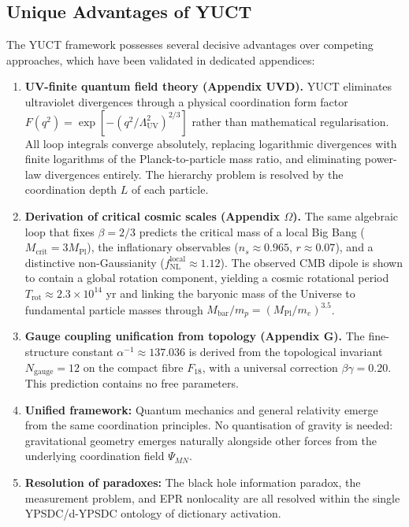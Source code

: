 \documentclass[12pt,a4paper]{article}
\theoremstyle{remark}
\begin{document}
\subsection{Unique Advantages of YUCT}

The YUCT framework possesses several decisive advantages over competing
approaches, which have been validated in dedicated appendices:

\begin{enumerate}
	\item \textbf{UV-finite quantum field theory (Appendix UVD).}
	YUCT eliminates ultraviolet divergences through a physical coordination
	form factor $F(q^2)=\exp[-(q^2/\Lambda_{\mathrm{UV}}^2)^{2/3}]$ rather than
	mathematical regularisation. All loop integrals converge absolutely,
	replacing logarithmic divergences with finite logarithms of the
	Planck-to-particle mass ratio, and eliminating power-law divergences
	entirely. The hierarchy problem is resolved by the coordination depth
	$L$ of each particle.
	
	\item \textbf{Derivation of critical cosmic scales (Appendix $\Omega$).}
	The same algebraic loop that fixes $\beta=2/3$ predicts the critical
	mass of a local Big Bang ($M_{\mathrm{crit}}=3M_{\mathrm{Pl}}$), the
	inflationary observables ($n_s\approx0.965$, $r\approx0.07$), and a
	distinctive non-Gaussianity ($f_{\mathrm{NL}}^{\mathrm{local}}\approx1.12$).
	The observed CMB dipole is shown to contain a global rotation component,
	yielding a cosmic rotational period $T_{\mathrm{rot}}\approx2.3\times10^{14}$ yr
	and linking the baryonic mass of the Universe to fundamental particle
	masses through $M_{\mathrm{bar}}/m_p=(M_{\mathrm{Pl}}/m_e)^{3.5}$.
	
	\item \textbf{Gauge coupling unification from topology (Appendix G).}
	The fine-structure constant $\alpha^{-1}\approx137.036$ is derived from the
	topological invariant $N_{\mathrm{gauge}}=12$ on the compact fibre $F_{18}$,
	with a universal correction $\beta\gamma=0.20$. This prediction contains
	no free parameters.
	
	\item \textbf{Unified framework:} Quantum mechanics and general relativity
	emerge from the same coordination principles. No quantisation of gravity
	is needed: gravitational geometry emerges naturally alongside other forces
	from the underlying coordination field $\Psi_{MN}$.
	
	\item \textbf{Resolution of paradoxes:} The black hole information paradox,
	the measurement problem, and EPR nonlocality are all resolved within the
	single YPSDC/d-YPSDC ontology of dictionary activation.
	

\end{enumerate}
\end{document}
